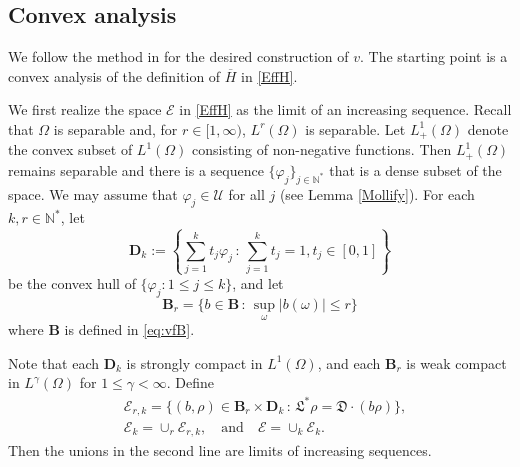\documentclass[11pt,reqno]{amsart}
\theoremstyle{definition}
\theoremstyle{remark}
\numberwithin{equation}{section}
\newcommand{\ol}{\overline}
\begin{document}
\subsection{Convex analysis} We follow the method in \cite{KRV06} for the desired construction of $v$. The starting point is a convex analysis of the definition of $\ol{H}$ in \eqref{EffH}. 

We first realize the space $\mathscr{E}$ in \eqref{EffH} as the limit of an increasing sequence. Recall that $\Omega$ is separable and, for $r \in [1,\infty)$, $L^r(\Omega)$ is separable. Let $L^1_+(\Omega)$ denote the convex subset of $L^1(\Omega)$ consisting of non-negative functions. Then $L^1_+(\Omega)$ remains separable and there is a sequence $\{\varphi_j\}_{j\in \mathbb{N}^*}$ that is a dense subset of the space. We may assume that $\varphi_j\in \mathscr{U}$ for all $j$ (see Lemma \ref{Mollify}). For each $k,r \in \mathbb{N}^*$, let
\begin{equation*}
    \mathbf{D}_{k}:=\left\{ \textstyle\sum_{j=1}^{k}t_{j}\varphi_{j} \,:\, \sum_{j=1}^{k}t_{j} =1, t_{j}\in [0,1]\right\}
\end{equation*}
be the convex hull of $\{\varphi_{j}: 1\leq j \leq k\}$, and let
\begin{equation*}
\mathbf{B}_{r} = \{b \in \mathbf{B} \,:\, \sup_{\omega}|b(\omega)| \leq r\}
\end{equation*}
where $\mathbf{B}$ is defined in \eqref{eq:vfB}. 

Note that each $\mathbf{D}_{k}$ is strongly compact in $L^{1}(\Omega)$, and each $\mathbf{B}_{r}$ is weak compact in $L^\gamma(\Omega)$ for $1 \leq \gamma < \infty$. Define
\begin{align*}
    & \mathscr{E}_{r,k} =  \{(b,\rho) \in \mathbf{B}_{r} \times \mathbf{D}_{k} \,:\,  \mathfrak{L}^*\rho = \mathfrak{D}\cdot(b \rho )\}, \\
    & \mathscr{E}_{k} =  \cup_{r}\mathscr{E}_{r,k}, \quad \text{and} \quad \mathscr{E} =  \cup_{k} \mathscr{E}_{k}.
\end{align*}
Then the unions in the second line are limits of increasing sequences. 

\medskip
\end{document}
